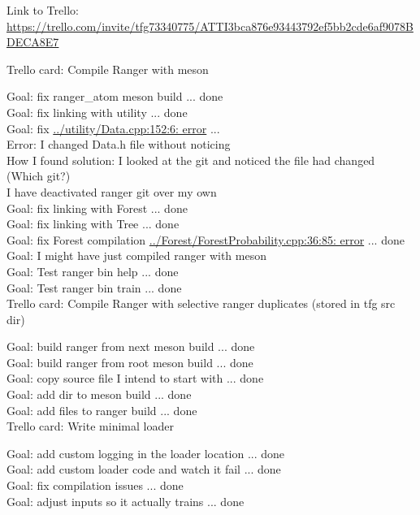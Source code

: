 \documentclass[12pt,oneside]{book}
\begin{document}
  Link to Trello: \url{https://trello.com/invite/tfg73340775/ATTI3bca876e93443792ef5bb2cde6af9078BDECA8E7}

  Trello card: Compile Ranger with meson

  Goal: fix ranger\_atom meson build ... done \\
  Goal: fix linking with utility  ... done \\
  Goal: fix \url{../utility/Data.cpp:152:6: error} ... \\
  Error: I changed Data.h file without noticing \\
  How I found solution: I looked at the git and noticed the file had changed \\
  (Which git?) \\
  I have deactivated ranger git over my own \\
  Goal: fix linking with Forest ... done \\
  Goal: fix linking with Tree ... done \\
  Goal: fix Forest compilation \url{../Forest/ForestProbability.cpp:36:85: error} ... done \\
  Goal: I might have just compiled ranger with meson \\
  Goal: Test ranger bin help ... done \\
  Goal: Test ranger bin train ... done \\

  Trello card: Compile Ranger with selective ranger duplicates (stored in tfg src dir)

  Goal: build ranger from next meson build ... done \\
  Goal: build ranger from root meson build ... done \\
  Goal: copy source file I intend to start with ... done \\
  Goal: add dir to meson build ... done \\
  Goal: add files to ranger build ... done \\
  
  Trello card: Write minimal loader

  Goal: add custom logging in the loader location ... done \\
  Goal: add custom loader code and watch it fail ... done \\ %
  Goal: fix compilation issues ... done \\ %
  Goal: adjust inputs so it actually trains ... done \\ %
\end{document}
